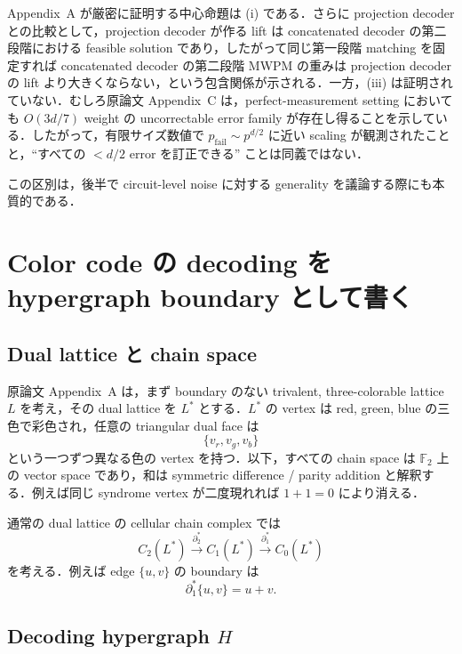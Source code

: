 \documentclass[a4paper,11pt]{ltjsarticle}
\newcommand{\F}{\mathbb{F}_2}
\newcommand{\bd}{\partial}
\begin{document}
Appendix~A が厳密に証明する中心命題は (i) である．さらに projection decoder との比較として，projection decoder が作る lift は concatenated decoder の第二段階における feasible solution であり，したがって同じ第一段階 matching を固定すれば concatenated decoder の第二段階 MWPM の重みは projection decoder の lift より大きくならない，という包含関係が示される．一方，(iii) は証明されていない．むしろ原論文 Appendix~C は，perfect-measurement setting においても $O(3d/7)$ weight の uncorrectable error family が存在し得ることを示している．したがって，有限サイズ数値で $p_{\mathrm{fail}}\sim p^{d/2}$ に近い scaling が観測されたことと，``すべての $<d/2$ error を訂正できる'' ことは同義ではない．

この区別は，後半で circuit-level noise に対する generality を議論する際にも本質的である．

\section{Color code の decoding を hypergraph boundary として書く}
\subsection{Dual lattice と chain space}

原論文 Appendix~A は，まず boundary のない trivalent, three-colorable lattice $L$ を考え，その dual lattice を $L^*$ とする．$L^*$ の vertex は red, green, blue の三色で彩色され，任意の triangular dual face は
\begin{equation}
  \{v_r,v_g,v_b\}
\end{equation}
という一つずつ異なる色の vertex を持つ．以下，すべての chain space は $\F$ 上の vector space であり，和は symmetric difference / parity addition と解釈する．例えば同じ syndrome vertex が二度現れれば $1+1=0$ により消える．

通常の dual lattice の cellular chain complex では
\begin{equation}
 C_2(L^*) \xrightarrow{\bd_2^*} C_1(L^*) \xrightarrow{\bd_1^*} C_0(L^*)
\end{equation}
を考える．例えば edge $\{u,v\}$ の boundary は
\begin{equation}
  \bd_1^*\{u,v\}=u+v.
\end{equation}

\subsection{Decoding hypergraph $H$}
\end{document}
